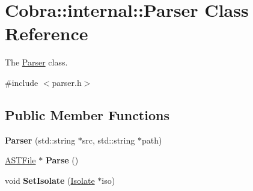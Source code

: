 \hypertarget{class_cobra_1_1internal_1_1_parser}{\section{Cobra\+:\+:internal\+:\+:Parser Class Reference}
\label{class_cobra_1_1internal_1_1_parser}
}


The \hyperlink{class_cobra_1_1internal_1_1_parser}{Parser} class.  




{\ttfamily \#include $<$parser.\+h$>$}

\subsection*{Public Member Functions}
\begin{DoxyCompactItemize}
\item 
\hypertarget{class_cobra_1_1internal_1_1_parser_a43abc03c8352fd332cfedee33f26acfc}{{\bfseries Parser} (std\+::string $\ast$src, std\+::string $\ast$path)}\label{class_cobra_1_1internal_1_1_parser_a43abc03c8352fd332cfedee33f26acfc}

\item 
\hypertarget{class_cobra_1_1internal_1_1_parser_a8051b75a9ac8860f4bed94e15a59058b}{\hyperlink{class_cobra_1_1internal_1_1_a_s_t_file}{A\+S\+T\+File} $\ast$ {\bfseries Parse} ()}\label{class_cobra_1_1internal_1_1_parser_a8051b75a9ac8860f4bed94e15a59058b}

\item 
\hypertarget{class_cobra_1_1internal_1_1_parser_a91dbe127c7b13d0a81af987b65da3730}{void {\bfseries Set\+Isolate} (\hyperlink{class_cobra_1_1internal_1_1_isolate}{Isolate} $\ast$iso)}\label{class_cobra_1_1internal_1_1_parser_a91dbe127c7b13d0a81af987b65da3730}

\end{DoxyCompactItemize}

